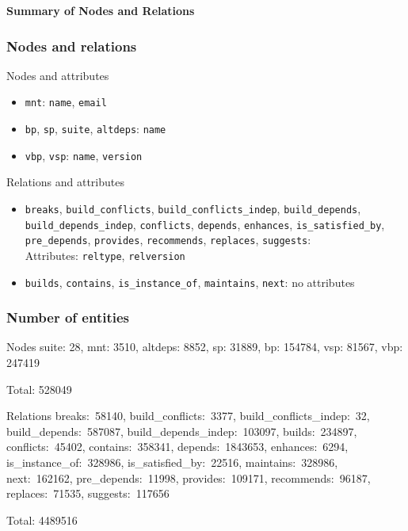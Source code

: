 \documentclass[hyperref]{beamer}
\newcommand{\cutin}[1]{%
\begin{frame}[c]\begin{center}{\Large\bf\color{myblue}#1}\end{center}\end{frame}}
\begin{document}
\cutin{Summary of Nodes and Relations}

\begin{frame}
  \frametitle{Nodes and relations}
  \begin{block}{Nodes and attributes}
    \begin{itemize}
    \item \texttt{mnt}: \texttt{name}, \texttt{email}
    \item \texttt{bp}, \texttt{sp}, \texttt{suite}, \texttt{altdeps}: \texttt{name}
    \item \texttt{vbp}, \texttt{vsp}: \texttt{name}, \texttt{version}
    \end{itemize}
  \end{block}

  \begin{block}{Relations and attributes}
    \begin{itemize}
    \item \texttt{breaks}, \texttt{build\_conflicts},
      \texttt{build\_conflicts\_indep}, \texttt{build\_depends},
      \texttt{build\_depends\_indep}, \texttt{conflicts},
      \texttt{depends}, \texttt{enhances}, \texttt{is\_satisfied\_by},
      \texttt{pre\_depends}, \texttt{provides}, \texttt{recommends}, 
      \texttt{replaces}, \texttt{suggests}:\\
      Attributes: \texttt{reltype}, \texttt{relversion}
    \item \texttt{builds}, \texttt{contains},
      \texttt{is\_instance\_of}, \texttt{maintains}, \texttt{next}: no attributes
    \end{itemize}
  \end{block}
\end{frame}

\begin{frame}
  \frametitle{Number of entities}
  \begin{block}{Nodes}
    suite: 28, mnt: 3510, altdeps: 8852, sp: 31889, bp: 154784, vsp:
    81567, vbp: 247419

    \bigskip
    Total: 528049
  \end{block}

  \begin{block}{Relations}
    breaks:~58140, build\_conflicts:~3377,
    build\_conflicts\_indep:~32, build\_depends:~587087,
    build\_depends\_indep:~103097, builds:~234897, conflicts:~45402,
    contains:~358341, depends:~1843653, enhances:~6294,
    is\_instance\_of:~328986, is\_satisfied\_by:~22516,
    maintains:~328986, next:~162162, pre\_depends:~11998,
    provides:~109171, recommends:~96187, replaces:~71535,
    suggests:~117656

    \bigskip
    Total: 4489516
  \end{block}
\end{frame}
\end{document}
